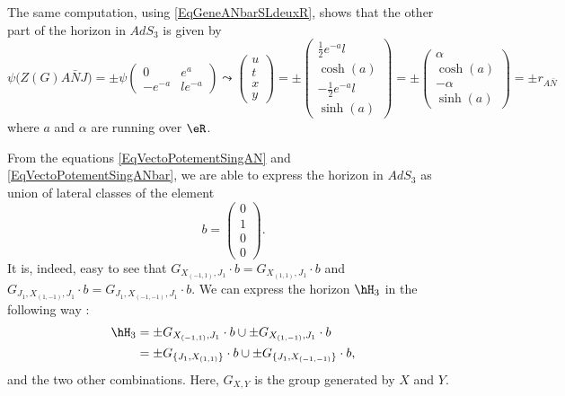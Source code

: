 The same computation, using \eqref{EqGeneANbarSLdeuxR}, shows that the other part of the horizon in $AdS_3$ is given by
\begin{equation}		\label{EqVectoPotementSingANbar}
\psi\big( Z(G)A\bar NJ\big)
=
\pm\psi
\begin{pmatrix}
	0	&	e^a	\\ 
	- e^{-a}	&	l e^{-a}	
\end{pmatrix}
\leadsto
\begin{pmatrix}
	u	\\ 
	t	\\ 
	x	\\ 
	y	
\end{pmatrix}=
\pm
\begin{pmatrix}
	\frac{1}{ 2 } e^{-a}l	\\ 
	\cosh(a)	\\ 
	-\frac{1}{ 2 } e^{-a}l	\\ 
	\sinh(a)	
\end{pmatrix}
=
\pm
\begin{pmatrix}
	\alpha	\\ 
	\cosh(a)	\\ 
	-\alpha	\\ 
	\sinh(a)	
\end{pmatrix}
=\pm
r_{A\bar N}
\end{equation}
where $a$ and $\alpha$ are running over $\eR$.

From the equations \eqref{EqVectoPotementSingAN} and \eqref{EqVectoPotementSingANbar}, we are able to express the horizon in $AdS_3$ as union of lateral classes of the element
\begin{equation}
	b=\begin{pmatrix}
		0	\\ 
		1	\\ 
		0	\\ 
		0	
	\end{pmatrix}.
\end{equation}
It is, indeed, easy to see that $G_{ X_{(-1,1)},J_1}\cdot b =G_{ X_{(1,1)},J_1}\cdot b$ and $G_{ J_1,X_{(1,-1)},J_1}\cdot b=G_{ J_1,X_{(-1,-1)} ,J_1}\cdot b$. We can express the horizon $\hH_3$ in the following way :
\begin{equation}
	\begin{aligned}[]
		\hH_3	&=\pm G_{ X_{(-1,1)},J_1}\cdot b\cup \pm G_{ X_{(1,-1)},J_1}\cdot b  \\
			&=\pm G_{ \{J_1,X_{(1,1)}\}}\cdot b\cup \pm G_{ \{J_1,X_{(-1,-1)}\}}\cdot b,
	\end{aligned}
\end{equation}
and the two other combinations. Here, $G_{X,Y}$ is the group generated by $X$ and $Y$.

